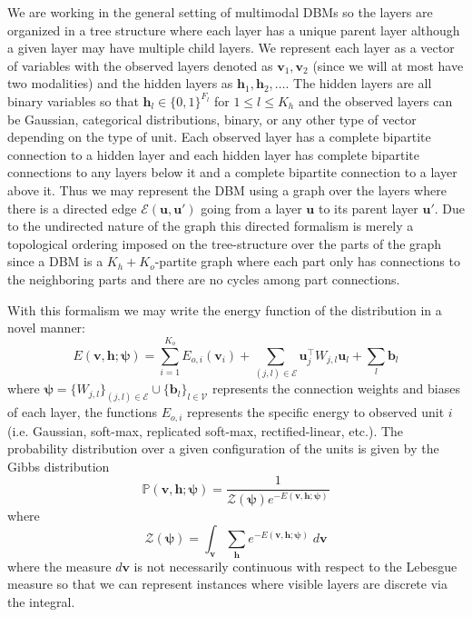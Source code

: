 \documentclass{article} %
\begin{document}
We are working in the general setting of multimodal DBMs so the layers are organized in a tree structure where each layer
has a unique parent layer although a given layer may have multiple child layers.  We represent each layer as a vector of variables
with the observed layers denoted as $\mathbf{v}_1,\mathbf{v}_2$ (since we will
at most have two modalities) and the hidden layers as $\mathbf{h}_1,\mathbf{h}_2,\ldots$.  The hidden layers are all binary variables
so that $\mathbf{h}_l\in \{0,1\}^{F_l}$ for $1\leq l\leq K_h$ and the observed layers can be Gaussian, categorical distributions, binary,
or any other type of vector depending on the type of unit. Each observed layer has a complete bipartite connection to a hidden layer
and each hidden layer has complete bipartite connections to any layers below it and a complete bipartite connection to a layer above it.
Thus we may represent the DBM using a graph over the layers where there is a directed edge $\mathcal{E}(\mathbf{u},\mathbf{u}')$
going from a layer $\mathbf{u}$ to its parent layer $\mathbf{u}'$.  Due to the undirected nature of the graph this directed formalism
is merely a topological ordering imposed on the tree-structure over the parts of the graph since a DBM is a $K_h+K_o$-partite graph
where each part only has connections to the neighboring parts and there are no cycles among part connections.

With this formalism we may write the energy function of the distribution in a novel manner:
\begin{equation}
E(\mathbf{v},\mathbf{h};\boldsymbol{\psi}) = \sum_{i=1}^{K_o} E_{o,i}(\mathbf{v}_i) + \sum_{(j,l)\in\mathcal{E}} \mathbf{u}^\top_j W_{j,l}\mathbf{u}_l + \sum_l \mathbf{b}_l
\end{equation}
where $\boldsymbol{\psi}=\{ W_{j,l} \}_{(j,l)\in\mathcal{E}} \cup \{ \mathbf{b}_l \}_{l\in\mathcal{V}}$ represents the connection weights and biases
of each layer, the functions $E_{o,i}$ represents the specific energy to observed unit $i$ (i.e. Gaussian, soft-max, replicated soft-max, rectified-linear, etc.).  The probability distribution over a given configuration of the units is given by the Gibbs distribution
\begin{equation}
\mathbb{P}(\mathbf{v},\mathbf{h};\boldsymbol{\psi}) = \frac{1}{\mathcal{Z}(\boldsymbol{\psi})e^{-E(\mathbf{v},\mathbf{h};\boldsymbol{\psi})}}
\end{equation}
where
\begin{equation}
\mathcal{Z}(\boldsymbol{\psi}) = \int_{\mathbf{v}}\sum_{\mathbf{h}} e^{-E(\mathbf{v},\mathbf{h};\boldsymbol{\psi})}\;d\mathbf{v}
\end{equation}
where the measure $d\mathbf{v}$ is not necessarily continuous with respect to the Lebesgue measure so that we can represent
instances where visible layers are discrete via the integral.
\end{document}
